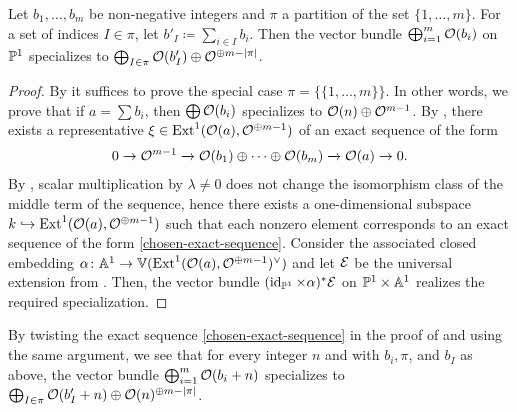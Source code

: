 \begin{proposition} \label{specialization-partitions}
	Let $b_1,\dotsc,b_m$ be non-negative integers and $\pi$ a partition of the set $\{1,\dotsc,m\}$. For a set of indices $I\in \pi$, let $b'_I \coloneqq \sum_{i \in I} b_i$. Then the vector bundle $\bigoplus_{i=1}^m \mathcal{O} (b_i)$ on $\mathbb{P}^1$ specializes to $\bigoplus_{I\in\pi} \mathcal{O}(b'_I) \oplus \mathcal{O}^{\oplus m-\lvert\pi\rvert}$.	
\end{proposition}

\begin{proof}
	By  it suffices to prove the special case $\pi = \{\{1,\dotsc,m\}\}$. In other words, we prove that if $a = \sum b_i$, then $\bigoplus\mathcal{O}(b_i)$ specializes to $\mathcal{O}(n)\oplus \mathcal{O}^{m-1}$. By , there exists a representative $\xi \in \operatorname{Ext}^1(\mathcal{O}(a),\mathcal{O}^{\oplus m-1})$ of an exact sequence of the form
	\begin{align} \label{chosen-exact-sequence}
		\sesarrows{\mc{O}^{m-1}}{}{\mc{O}(b_1)\oplus \dotsb \oplus \mc{O}(b_m)}{}{\mc{O}(a)}. %
	\end{align}
	By , scalar multiplication by $\lambda \neq 0$ does not change the isomorphism class of the middle term of the sequence, hence there exists a one-dimensional subspace $k \injectto \Ext^1(\mc{O}(a),\mc{O}^{\oplus m-1})$ such that each nonzero element corresponds to an exact sequence of the form
	\cref{chosen-exact-sequence}. Consider the associated closed embedding $\alpha \colon \mathbb{A}^1 \to \mathbb{V}(\operatorname{Ext}^1(\mathcal{O}(a),\mathcal{O}^{\oplus m-1})^\vee)$ and let $\mathcal{E}$ be the universal extension from . Then, the vector bundle $(\operatorname{id}_{\mathbb{P}^1}\times\alpha)^{*}\mathcal{E}$ on $\mathbb{P}^1\times\mathbb{A}^1$ realizes the required specialization. 
\end{proof}

\begin{remark}
	By twisting the exact sequence \cref{chosen-exact-sequence} in the proof of  and using the same argument, we see that for every integer $n$ and with $b_i, \pi$, and $b_I$ as above, the vector bundle $\bigoplus_{i=1}^m \mathcal{O} (b_i+n)$ specializes to $\bigoplus_{I\in\pi} \mathcal{O}(b'_I+n) \oplus \mathcal{O}(n)^{\oplus m-\lvert\pi\rvert}$.
\end{remark}